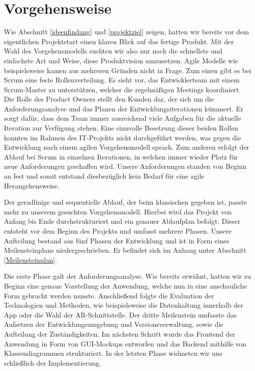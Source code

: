 \section{Vorgehensweise}
Wie Abschnitt \ref{ideenfindung} und \ref{projektziel} zeigen, hatten wir bereits vor dem eigentlichen Projektstart einen klaren Blick auf das fertige Produkt.
Mit der Wahl des Vorgehensmodells suchten wir also nur noch die schnellste und einfachste Art und Weise, diese Produktvision umzusetzen. 
Agile Modelle wie beispielsweise  kamen aus mehreren Gründen nicht in Frage. 
Zum einen gibt es bei Scrum eine feste Rollenverteilung. 
Es sieht vor, das Entwicklerteam mit einem Scrum-Master zu unterstützen, welcher die regelmäßigen Meetings koordiniert. 
Die Rolle des Product Owners stellt den Kunden dar, der sich um die Anforderungsanalyse und das Planen der Entwicklungsiterationen kümmert. 
Er sorgt dafür, dass dem Team immer ausreichend viele Aufgaben für die aktuelle Iteration zur Verfügung stehen. 
Eine sinnvolle Besetzung dieser beiden Rollen konnten im Rahmen des IT-Projekts nicht durchgeführt werden, was gegen die Entwicklung nach einem agilen Vorgehensmodell sprach.
Zum anderen erfolgt der Ablauf bei Scrum in einzelnen Iterationen, in welchen immer wieder Platz für neue Anforderungen geschaffen wird. 
Unsere Anforderungen standen von Beginn an fest und somit entstand diesbezüglich kein Bedarf für eine agile Herangehensweise.

Der geradlinige und sequentielle Ablauf, der beim klassischen  gegeben ist, passte mehr zu unserem gesuchten Vorgehensmodell.
Hierbei wird das Projekt von Anfang bis Ende durchstrukturiert und ein genauer Ablaufplan befolgt.
Dieser entsteht vor dem Beginn des Projekts und umfasst mehrere Phasen. 
Unsere Aufteilung bestand aus fünf Phasen der Entwicklung und ist in Form eines Meilensteinplans niedergeschrieben. Er befindet sich im Anhang unter Abschnitt \ref{Meilensteinplan}.

Die erste Phase galt der Anforderungsanalyse. 
Wie bereits erwähnt, hatten wir zu Beginn eine genaue Vorstellung der Anwendung, welche nun in eine anschauliche Form gebracht werden musste. 
Anschließend folgte die Evaluation der Technologien und Methoden, wie beispielsweise die Datenhaltung innerhalb der App oder die Wahl der AR-Schnittstelle.
Der dritte Meilenstein umfasste das Aufsetzen der Entwicklungsumgebung und Versionsverwaltung, sowie die Aufteilung der Zuständigkeiten.
Im nächsten Schritt wurde das Frontend der Anwendung in Form von GUI-Mockups entworfen und das Backend mithilfe von Klassendiagrammen strukturiert.
In der letzten Phase widmeten wir uns schließlich der Implementierung.
